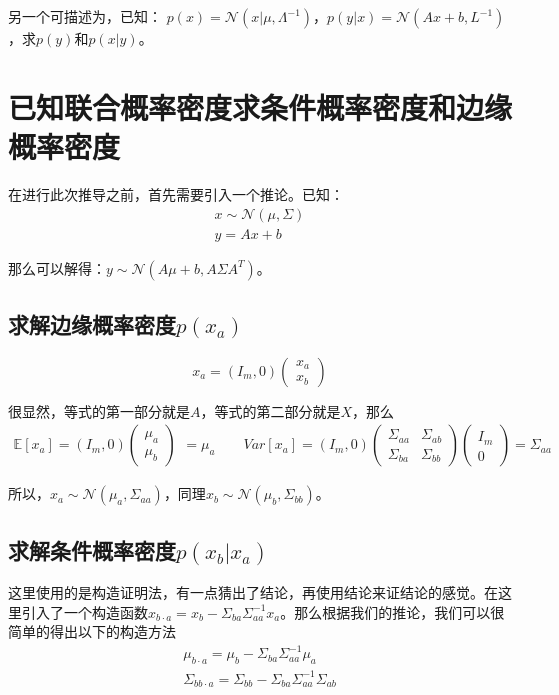 \documentclass[a4paper]{article}
\begin{document}
另一个可描述为，已知：
$p(x)=\mathcal{N}(x|\mu,\Lambda^{-1})$，$p(y|x)=\mathcal{N}(Ax+b,L^{-1})$，求$p(y)$和$p(x|y)$。

\section{已知联合概率密度求条件概率密度和边缘概率密度}
在进行此次推导之前，首先需要引入一个推论。已知：
\begin{gather}
    x\sim \mathcal{N}(\mu,\Sigma) \\
    y = Ax + b
\end{gather}

那么可以解得：$y\sim \mathcal{N}(A\mu+b, A\Sigma A^T)$。
\subsection{求解边缘概率密度$p(x_a)$}
\begin{equation}
    x_a = (I_m,0)
    \begin{pmatrix}
        x_a \\
        x_b
    \end{pmatrix}
\end{equation}

很显然，等式的第一部分就是$A$，等式的第二部分就是$X$，那么
\begin{equation}
    \begin{split}
        \mathbb{E}[x_a]=(I_m,0)
    \begin{pmatrix}
        \mu_a \\
        \mu_b
    \end{pmatrix}
    \end{split}=\mu_a \qquad
    Var[x_a] = (I_m,0)
    \begin{pmatrix}
    \Sigma_{aa} & \Sigma_{ab} \\
    \Sigma_{ba} & \Sigma_{bb} 
    \end{pmatrix}
    \begin{pmatrix}
    I_m \\
    0  
    \end{pmatrix}=\Sigma_{aa}
\end{equation}

所以，$x_a\sim \mathcal{N}(\mu_a, \Sigma_{aa})$，同理$x_b \sim \mathcal{N}(\mu_b,\Sigma_{bb})$。

\subsection{求解条件概率密度$p(x_b|x_a)$}
这里使用的是构造证明法，有一点猜出了结论，再使用结论来证结论的感觉。在这里引入了一个构造函数$x_{b\cdot a}=x_b-\Sigma_{ba}\Sigma_{aa}^{-1}x_a$。那么根据我们的推论，我们可以很简单的得出以下的构造方法
\begin{gather}
    \mu_{b\cdot a}= \mu_b-\Sigma_{ba}\Sigma_{aa}^{-1}\mu_a \\
    \Sigma_{bb \cdot a} = \Sigma_{bb}-\Sigma_{ba}\Sigma_{aa}^{-1}\Sigma_{ab} 
\end{gather}
\end{document}
